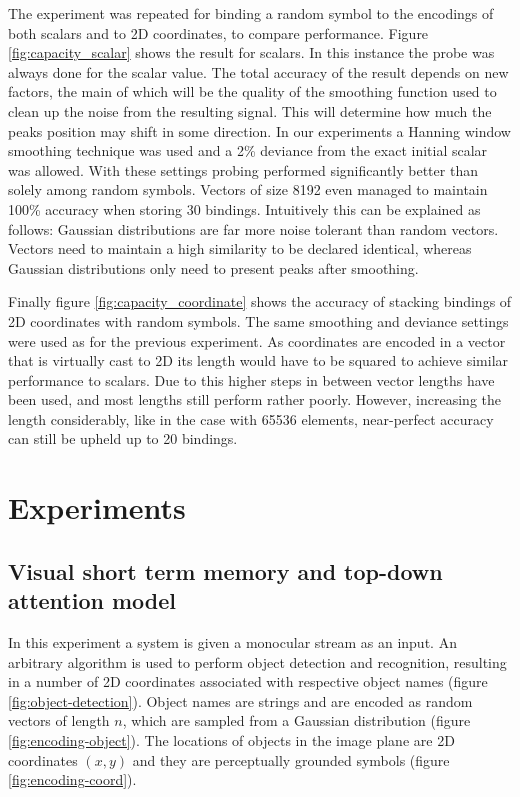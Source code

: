\documentclass[conference]{IEEEtran}
\begin{document}
	The experiment was repeated for binding a random symbol to the encodings of both scalars and to 2D coordinates, to compare performance. Figure \ref{fig:capacity_scalar} shows the result for scalars. In this instance the probe was always done for the scalar value. The total accuracy of the result depends on new factors, the main of which will be the quality of the smoothing function used to clean up the noise from the resulting signal. This will determine how much the peaks position may shift in some direction. In our experiments a Hanning window smoothing technique was used and a 2\% deviance from the exact initial scalar was allowed. With these settings probing performed significantly better than solely among random symbols. Vectors of size 8192 even managed to maintain 100\% accuracy when storing 30 bindings. Intuitively this can be explained as follows: Gaussian distributions are far more noise tolerant than random vectors. Vectors need to maintain a high similarity to be declared identical, whereas Gaussian distributions only need to present peaks after smoothing. 
	
	Finally figure \ref{fig:capacity_coordinate} shows the accuracy of stacking bindings of 2D coordinates with random symbols. The same smoothing and deviance settings were used as for the previous experiment. As coordinates are encoded in a vector that is virtually cast to 2D its length would have to be squared to achieve similar performance to scalars. Due to this higher steps in between vector lengths have been used, and most lengths still perform rather poorly. However, increasing the length considerably, like in the case with 65536 elements, near-perfect accuracy can still be upheld up to 20 bindings.
		

		
	\section{Experiments}
	\label{sec:experiments}
	\subsection{Visual short term memory and top-down attention model}
	
	In this experiment a system is given a monocular stream as an input. An arbitrary algorithm is used to perform object detection and recognition, resulting in a number of 2D coordinates associated with respective object names (figure \ref{fig:object-detection}). Object names are strings and are encoded as random vectors of length $n$, which are sampled from a Gaussian distribution (figure \ref{fig:encoding-object}). The locations of objects in the image plane are 2D coordinates $(x,y)$ and they are perceptually grounded symbols (figure \ref{fig:encoding-coord}).
\end{document}
